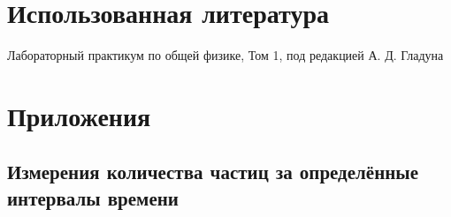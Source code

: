 \documentclass[12pt]{article}
\begin{document}
\section{Использованная литература}
\begin{thebibliography}{9}
    Лабораторный практикум по общей физике, Том 1, под редакцией А. Д. Гладуна
\end{thebibliography}

\section{Приложения}
\subsection{Измерения количества частиц за определённые интервалы времени} \label{sec:app_1}
\end{document}
